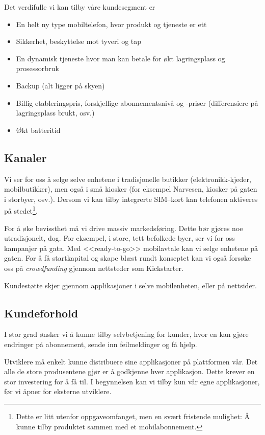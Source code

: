 Det verdifulle vi kan tilby våre kundesegment er
%
\begin{itemize}
  \item En helt ny type mobiltelefon, hvor produkt og tjeneste er ett
  \item Sikkerhet, beskyttelse mot tyveri og tap
  \item En dynamisk tjeneste hvor man kan betale for økt lagringsplass og
    prosessorbruk
  \item Backup (alt ligger på skyen)
  \item Billig etableringspris, forskjellige abonnementsnivå og
    -priser (differensiere på lagringsplass brukt, osv.)
  \item Økt batteritid
\end{itemize}

\subsection{Kanaler}

Vi ser for oss å selge selve enhetene i tradisjonelle butikker
(elektronikk-kjeder, mobilbutikker), men også i små kiosker (for eksempel
Narvesen, kiosker på gaten i storbyer, osv.). Dersom vi kan tilby integrerte
SIM--kort kan telefonen aktiveres på stedet\footnote{Dette er litt utenfor
oppgaveomfanget, men en svært fristende mulighet: Å kunne tilby produktet
sammen med et mobilabonnement.}.

For å øke bevissthet må vi drive massiv markedsføring. Dette bør gjøres noe
utradisjonelt, dog. For eksempel, i store, tett befolkede byer, ser vi for oss
kampanjer på gata. Med <<ready-to-go>> mobilavtale kan vi selge enhetene på
gaten. For å få startkapital og skape blæst rundt konseptet kan vi også forsøke
oss på \textit{crowdfunding} gjennom nettsteder som Kickstarter.

Kundestøtte skjer gjennom applikasjoner i selve mobilenheten, eller på nettsider.

\subsection{Kundeforhold}

I stor grad ønsker vi å kunne tilby selvbetjening for kunder, hvor en kan gjøre
endringer på abonnement, sende inn feilmeldinger og få hjelp.

Utviklere må enkelt kunne distribuere sine applikasjoner på plattformen vår.  Det alle
de store produsentene gjør er å godkjenne hver applikasjon. Dette krever en stor
investering for å få til.  I begynnelsen kan vi tilby kun vår egne applikasjoner, før vi
åpner for eksterne utviklere.

